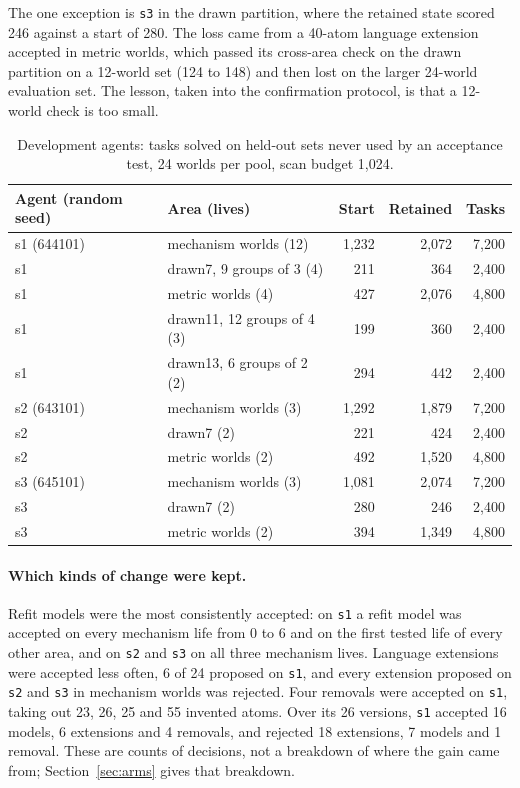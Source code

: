 \documentclass[11pt]{article}
\begin{document}
The one exception is \texttt{s3} in the drawn partition, where the retained state scored 246 against a start of 280. The loss came from a 40-atom language extension accepted in metric worlds, which passed its cross-area check on the drawn partition on a 12-world set (124 to 148) and then lost on the larger 24-world evaluation set. The lesson, taken into the confirmation protocol, is that a 12-world check is too small.

\begin{table}[t]
\centering
\caption{Development agents: tasks solved on held-out sets never used by an acceptance test, 24 worlds per pool, scan budget 1,024.}
\label{tab:growth}
\begin{tabular}{llrrr}
\toprule
Agent (random seed) & Area (lives) & Start & Retained & Tasks \\
\midrule
s1 (644101) & mechanism worlds (12) & 1,232 & 2,072 & 7,200 \\
s1 & drawn7, 9 groups of 3 (4) & 211 & 364 & 2,400 \\
s1 & metric worlds (4) & 427 & 2,076 & 4,800 \\
s1 & drawn11, 12 groups of 4 (3) & 199 & 360 & 2,400 \\
s1 & drawn13, 6 groups of 2 (2) & 294 & 442 & 2,400 \\
s2 (643101) & mechanism worlds (3) & 1,292 & 1,879 & 7,200 \\
s2 & drawn7 (2) & 221 & 424 & 2,400 \\
s2 & metric worlds (2) & 492 & 1,520 & 4,800 \\
s3 (645101) & mechanism worlds (3) & 1,081 & 2,074 & 7,200 \\
s3 & drawn7 (2) & 280 & 246 & 2,400 \\
s3 & metric worlds (2) & 394 & 1,349 & 4,800 \\
\bottomrule
\end{tabular}
\end{table}

\paragraph{Which kinds of change were kept.} Refit models were the most consistently accepted: on \texttt{s1} a refit model was accepted on every mechanism life from 0 to 6 and on the first tested life of every other area, and on \texttt{s2} and \texttt{s3} on all three mechanism lives. Language extensions were accepted less often, 6 of 24 proposed on \texttt{s1}, and every extension proposed on \texttt{s2} and \texttt{s3} in mechanism worlds was rejected. Four removals were accepted on \texttt{s1}, taking out 23, 26, 25 and 55 invented atoms. Over its 26 versions, \texttt{s1} accepted 16 models, 6 extensions and 4 removals, and rejected 18 extensions, 7 models and 1 removal. These are counts of decisions, not a breakdown of where the gain came from; Section~\ref{sec:arms} gives that breakdown.
\end{document}
